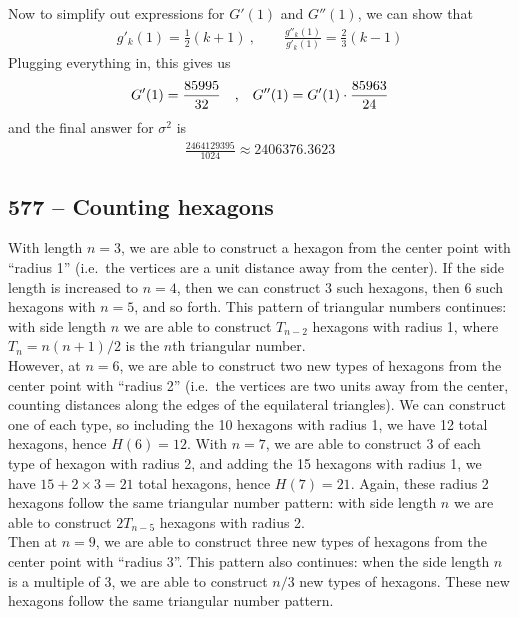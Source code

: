 \documentclass{article}
\begin{document}
Now to simplify out expressions for $G'(1)$ and $G''(1)$, we can show that
\begin{align*}
	g'_k(1) = \frac{1}{2}(k+1) ~, \qquad \frac{g''_k(1)}{g'_k(1)} = \frac{2}{3}(k-1)
\end{align*}
Plugging everything in, this gives us
\begin{align*}
	G'(1) = \frac{85995}{32} \qq{,} G''(1) = G'(1) \cdot \frac{85963}{24}
\end{align*}
and the final answer for $\sigma^2$ is
\begin{align*}
	\frac{2464129395}{1024} \approx \boxed{ 2406376.3623}
\end{align*}


\subsection*{577 -- Counting hexagons}
With length $n=3$, we are able to construct a hexagon from the center point with ``radius 1'' (i.e.~the vertices are a unit distance away from the center).
If the side length is increased to $n=4$, then we can construct 3 such hexagons, then 6 such hexagons with $n=5$, and so forth.
This pattern of triangular numbers continues: with side length $n$ we are able to construct $T_{n-2}$ hexagons with radius 1, where $T_n = n(n+1)/2$ is the $n$th triangular number. \\

However, at $n=6$, we are able to construct two new types of hexagons from the center point with ``radius 2'' (i.e.~the vertices are two units away from the center, counting distances along the edges of the equilateral triangles).
We can construct one of each type, so including the 10 hexagons with radius 1, we have 12 total hexagons, hence $H(6)=12$.
With $n=7$, we are able to construct 3 of each type of hexagon with radius 2, and adding the 15 hexagons with radius 1, we have $15 + 2\times 3 = 21$ total hexagons, hence $H(7)=21$.
Again, these radius 2 hexagons follow the same triangular number pattern: with side length $n$ we are able to construct $2T_{n-5}$ hexagons with radius 2. \\

Then at $n=9$, we are able to construct three new types of hexagons from the center point with ``radius 3''.
This pattern also continues: when the side length $n$ is a multiple of 3, we are able to construct $n/3$ new types of hexagons.
These new hexagons follow the same triangular number pattern. \\
\end{document}

